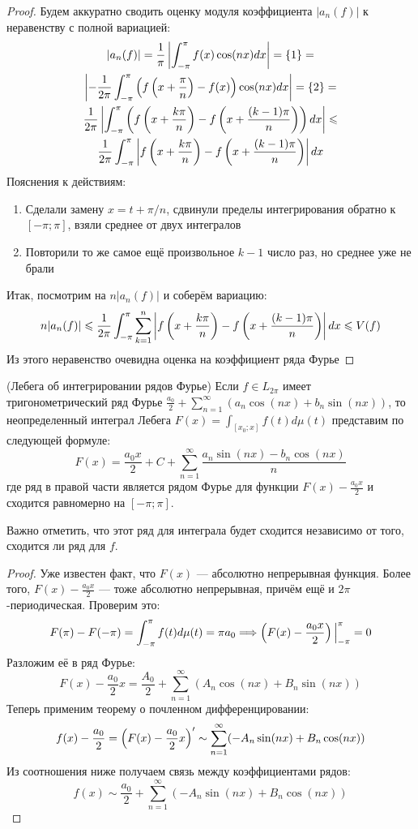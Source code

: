 \begin{proof}
	Будем аккуратно сводить оценку модуля коэффициента $|a_n(f)|$ к неравенству с полной вариацией:
	\begin{multline*}
		|a_n(f)| = \frac{1}{\pi}\left|\int_{-\pi}^\pi f(x)\cos(nx)dx\right| = \{1\} =
		\\
		\left|-\frac{1}{2\pi} \int_{-\pi}^\pi \left(f\left(x + \frac{\pi}{n}\right) - f(x)\right)\cos(nx)dx\right| = \{2\} =
		\\
		\frac{1}{2\pi} \left|\int_{-\pi}^\pi \left(f\left(x + \frac{k\pi}{n}\right) - f\left(x + \frac{(k - 1)\pi}{n}\right)\right)dx\right| \leqslant
		\\
		\frac{1}{2\pi} \int_{-\pi}^\pi \left|f\left(x + \frac{k\pi}{n}\right) - f\left(x + \frac{(k - 1)\pi}{n}\right)\right|dx
	\end{multline*}
	Пояснения к действиям:
	\begin{enumerate}
		\item Сделали замену $x = t + \pi / n$, сдвинули пределы интегрирования обратно к $[-\pi; \pi]$, взяли среднее от двух интегралов
		
		\item Повторили то же самое ещё произвольное $k - 1$ число раз, но среднее уже не брали
	\end{enumerate}
	Итак, посмотрим на $n|a_n(f)|$ и соберём вариацию:
	\[
		n|a_n(f)| \leqslant \frac{1}{2\pi} \int_{-\pi}^\pi \sum_{k = 1}^n \left|f\left(x + \frac{k\pi}{n}\right) - f\left(x + \frac{(k - 1)\pi}{n}\right)\right|dx \leqslant V(f)
	\]
	Из этого неравенство очевидна оценка на коэффициент ряда Фурье
\end{proof}

\begin{theorem} (Лебега об интегрировании рядов Фурье)
	Если $f \in L_{2\pi}$ имеет тригонометрический ряд Фурье $\frac{a_0}{2} + \sum_{n = 1}^\infty (a_n\cos(nx) + b_n\sin(nx))$, то неопределенный интеграл Лебега $F(x) = \int_{[x_0; x]} f(t)d\mu(t)$ представим по следующей формуле:
	\[
		F(x) = \frac{a_0x}{2} + C + \sum_{n = 1}^\infty \frac{a_n\sin(nx) - b_n\cos(nx)}{n}
	\]
	где ряд в правой части является рядом Фурье для функции $F(x) - \frac{a_0x}{2}$ и сходится равномерно на $[-\pi; \pi]$.
\end{theorem}

\begin{note}
	Важно отметить, что этот ряд для интеграла будет сходится независимо от того, сходится ли ряд для $f$.
\end{note}

\begin{proof}
	Уже известен факт, что $F(x)$ --- абсолютно непрерывная функция. Более того, $F(x) - \frac{a_0x}{2}$ --- тоже абсолютно непрерывная, причём ещё и $2\pi$-периодическая. Проверим это:
	\[
		F(\pi) - F(-\pi) = \int_{-\pi}^\pi f(t)d\mu(t) = \pi a_0 \Longrightarrow \left(F(x) - \frac{a_0x}{2}\right)\Big|_{-\pi}^\pi = 0
	\]
	Разложим её в ряд Фурье:
	\[
		F(x) - \frac{a_0}{2}x = \frac{A_0}{2} + \sum_{n = 1}^\infty (A_n\cos(nx) + B_n\sin(nx))
	\]
	Теперь применим теорему о почленном дифференцировании:
	\[
		f(x) - \frac{a_0}{2} = \left(F(x) - \frac{a_0}{2}x\right)' \sim \sum_{n = 1}^\infty (-A_n\sin(nx) + B_n\cos(nx))
	\]
	Из соотношения ниже получаем связь между коэффициентами рядов:
	\[
		f(x) \sim \frac{a_0}{2} + \sum_{n = 1}^\infty (-A_n\sin(nx) + B_n\cos(nx))
	\]
\end{proof}